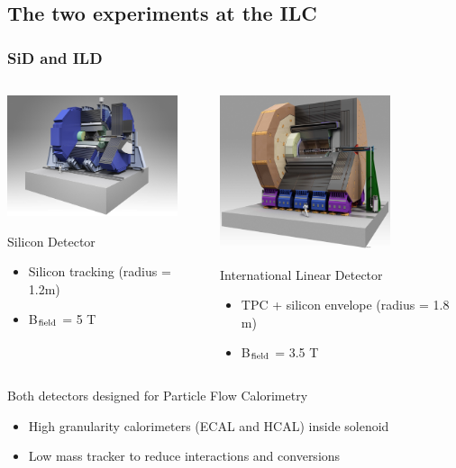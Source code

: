 \documentclass{beamer}
\begin{document}
\subsection{The two experiments at the ILC}
\begin{frame}
  \frametitle{SiD and ILD}

  \vspace{-0.12cm}
  \begin{columns}[t]
    \begin{column}{5cm}
      \includegraphics[width = 5cm, height = 2.9 cm]{Pictures/ILC_SiD.jpg}
      \vspace{-0.25cm}
      \begin{block}{Silicon Detector}
        \begin{itemize}
          \item Silicon tracking (radius = 1.2m)
          \item B$_{\rm{field}}$ = 5 T
        \end{itemize}
      \end{block}
    \end{column}

    \begin{column}{5cm}
      \includegraphics[width = 5cm, height = 2.9 cm]{Pictures/ILD_all_110826.jpg}
      \vspace{-0.25cm}
      \begin{block}{International Linear Detector}
        \begin{itemize}
          \item TPC + silicon envelope (radius = 1.8 m)
          \item B$_{\rm{field}}$ = 3.5 T
        \end{itemize}
      \end{block}
    \end{column}
  \end{columns}

  \vspace{-0.2cm}
  \begin{block}{Both detectors designed for Particle Flow Calorimetry}
      \begin{itemize}
          \item High granularity calorimeters (ECAL and HCAL) inside solenoid
              \vspace{-0.1cm}
          \item Low mass tracker to reduce interactions and conversions
      \end{itemize}
  \end{block}
\end{frame}
\end{document}
